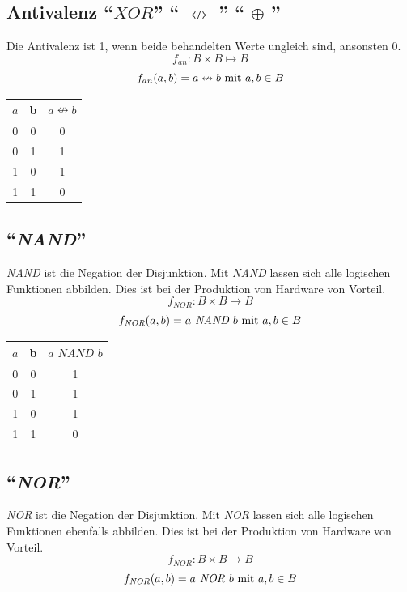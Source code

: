 \documentclass[11pt,a4paper]{scrreprt}
\begin{document}
\subsection{Antivalenz "`$XOR$"' "` $\nleftrightarrow$ "' "` $\oplus$ "'}
Die Antivalenz ist 1, wenn beide behandelten Werte ungleich sind, ansonsten 0.
$$ f_{an}: B \times B \mapsto B $$
$$ f_{an}(a, b) = a \nleftrightarrow b \textnormal{ mit } a, b \in B$$

\begin{center}
\begin{tabular}{ccc}
	$a$ & b & $a \nleftrightarrow b$ \\ \hline
	 0  & 0 &    0    \\
	 0  & 1 &    1    \\
	 1  & 0 &    1    \\
	 1  & 1 &    0    \\
\end{tabular}
\end{center}

\subsection{"`\textit{NAND}"'}
\textit{NAND} ist die Negation der Disjunktion. Mit \textit{NAND} lassen sich alle logischen Funktionen abbilden. Dies ist bei der Produktion von Hardware von Vorteil. 
$$ f_{\textit{NOR}}: B \times B \mapsto B $$
$$ f_{\textit{NOR}}(a, b) = a \textit{ NAND } b \textnormal{ mit } a, b \in B$$

\begin{center}
\begin{tabular}{ccc}
	$a$ & b & $a \textit{ NAND } b$ \\ \hline
	 0  & 0 &    1    \\
	 0  & 1 &    1    \\
	 1  & 0 &    1    \\
	 1  & 1 &    0    \\
\end{tabular}
\end{center}

\subsection{"`\textit{NOR}"'}
\textit{NOR} ist die Negation der Disjunktion. Mit \textit{NOR} lassen sich alle logischen Funktionen ebenfalls abbilden. Dies ist bei der Produktion von Hardware von Vorteil. 
$$ f_{\textit{NOR}}: B \times B \mapsto B $$
$$ f_{\textit{NOR}}(a, b) = a \textit{ NOR } b \textnormal{ mit } a, b \in B$$
\end{document}
